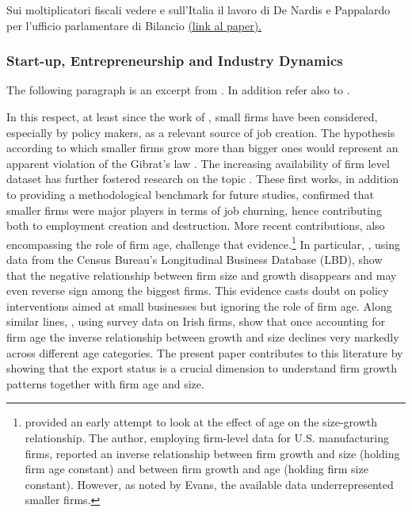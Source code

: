 \documentclass[12pt]{article}
\begin{document}
Sui moltiplicatori fiscali vedere \cite{spilimbergo_etal_2009_fiscal}   e sull'Italia il lavoro di De Nardis e Pappalardo per l'ufficio parlamentare di Bilancio \href{http://www.upbilancio.it/nota-di-lavoro-12018/}{(link al paper).}


\subsubsection*{Start-up, Entrepreneurship and Industry Dynamics}

The following paragraph is an excerpt from
\cite{grazzi_moschella_2018}. In addition refer also to
\cite{santarelli_vivarelli_2007, vivarelli_2013_ICC}. \vspace{0.5cm}


In this respect, at least
since the work of \cite{birch_1981}, small firms have been considered,
especially by policy makers, as a relevant source of job creation. The
hypothesis according to which smaller firms grow more than bigger ones
would represent an apparent violation of the Gibrat's law \citep[see,
among the others,][]{sutton_1997, lotti_etal_2003, coad_2009}. The
increasing availability of firm level dataset has further fostered
research on the topic
\citep[see, in particular,][]{davis_haltiwanger_1992, davis_etal_1996}. These first
works, in addition to providing a methodological benchmark for future
studies, confirmed that smaller firms were major players in terms of
job churning, hence contributing both to employment creation and
destruction. More recent contributions, also
encompassing the role of firm age, challenge that
evidence.\footnote{\cite{evans_1987_a, evans_1987_b} provided an early
  attempt to look at the effect of age on the size-growth
  relationship. The author, employing firm-level data for
  U.S. manufacturing firms, reported an inverse relationship between
  firm growth and size (holding firm age constant) and between firm
  growth and age (holding firm size constant). However, as noted by
  Evans, the available data underrepresented smaller firms.} In
particular, \cite{haltiwanger_etal_2013}, using data from the Census
Bureau's Longitudinal Business Database (LBD), show that the negative
relationship between firm size and growth disappears and may even
reverse sign among the biggest firms.  This evidence casts doubt on
policy interventions aimed at small businesses but ignoring the role
of firm age.  Along similar lines, \cite{lawless_2014}, using survey
data on Irish firms, show that once accounting for firm age the
inverse relationship between growth and size declines very markedly
across different age categories.  The present paper contributes to
this literature by showing that the export status is a
crucial dimension to understand firm growth patterns together with
firm age and size. 
\end{document}
